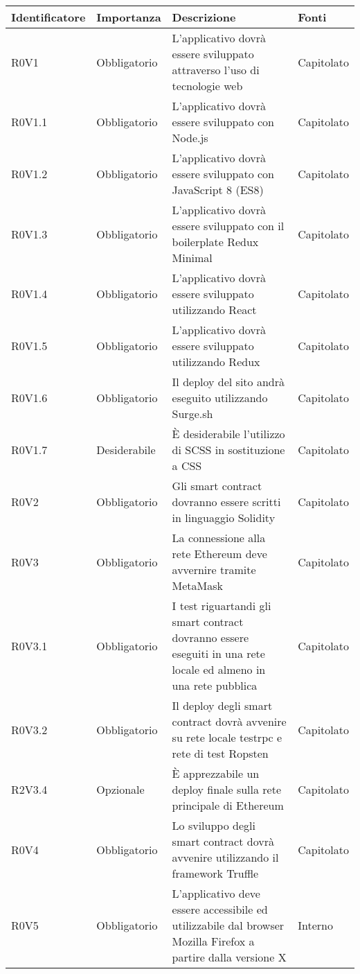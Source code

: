 \documentclass[AnalisiDeiRequisiti.tex]{subfiles}
\begin{document}
\begin{longtable}[H]{|p{2.5cm}|p{2.5cm}|p{5cm}|p{2cm}|}
	\hline
	\rowcolor[HTML]{38FFF8} 
	\textbf{Identificatore} & \textbf{Importanza} & \textbf{Descrizione} & \textbf{Fonti} \\ \hline
	\endhead
	R0V1 & Obbligatorio & L'applicativo dovrà essere sviluppato attraverso l'uso di tecnologie web & Capitolato \\ \hline
	R0V1.1 & Obbligatorio & L'applicativo dovrà essere sviluppato con Node.js & Capitolato \\ \hline
	R0V1.2 & Obbligatorio & L'applicativo dovrà essere sviluppato con JavaScript 8 (ES8) & Capitolato \\ \hline
	R0V1.3 & Obbligatorio & L'applicativo dovrà essere sviluppato con il boilerplate Redux Minimal & Capitolato \\ \hline
	R0V1.4 & Obbligatorio & L'applicativo dovrà essere sviluppato utilizzando React & Capitolato \\ \hline
	R0V1.5 & Obbligatorio & L'applicativo dovrà essere sviluppato utilizzando Redux & Capitolato \\ \hline
	R0V1.6 & Obbligatorio & Il deploy del sito andrà eseguito utilizzando Surge.sh & Capitolato \\ \hline
	R0V1.7 & Desiderabile & È desiderabile l'utilizzo di SCSS in sostituzione a CSS & Capitolato \\ \hline
	R0V2 & Obbligatorio & Gli smart contract dovranno essere scritti in linguaggio Solidity & Capitolato \\ \hline
	R0V3 & Obbligatorio & La connessione alla rete Ethereum deve avvernire tramite MetaMask & Capitolato \\ \hline
	R0V3.1 & Obbligatorio & I test riguartandi gli smart contract dovranno essere eseguiti in una rete locale ed almeno in una rete pubblica & Capitolato \\ \hline
	R0V3.2 & Obbligatorio & Il deploy degli smart contract dovrà avvenire su rete locale testrpc e rete di test Ropsten & Capitolato \\ \hline
	R2V3.4 & Opzionale & È apprezzabile un deploy finale sulla rete principale di Ethereum & Capitolato \\ \hline
	R0V4 & Obbligatorio & Lo sviluppo degli smart contract dovrà avvenire utilizzando il framework Truffle & Capitolato \\ \hline
	R0V5 & Obbligatorio & L'applicativo deve essere accessibile ed utilizzabile dal browser Mozilla Firefox a partire dalla versione X & Interno \\ \hline %

\end{longtable}
\end{document}
